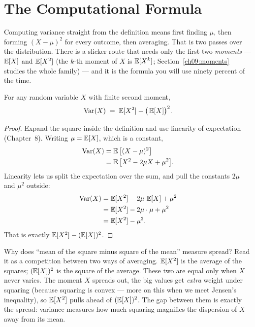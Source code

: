 \section{The Computational Formula}
\label{ch09:compformula}

Computing variance straight from the definition means first finding $\mu$,
then forming $(X-\mu)^2$ for every outcome, then averaging. That is two passes
over the distribution. There is a slicker route that needs only the first two
\emph{moments} --- $\operatorname{\mathbb{E}}[X]$ and $\operatorname{\mathbb{E}}[X^2]$ (the $k$-th moment of $X$ is $\operatorname{\mathbb{E}}[X^k]$; Section~\ref{ch09:moments} studies the whole family) --- and it is the formula you will
use ninety percent of the time.

\begin{theorem}
\label{ch09:thm-comp}
For any random variable $X$ with finite second moment,
\[
  \operatorname{Var}(X) \;=\; \operatorname{\mathbb{E}}[X^2] - \big(\operatorname{\mathbb{E}}[X]\big)^2.
\]
\end{theorem}

\begin{proof}
Expand the square inside the definition and use linearity of expectation
(Chapter~8). Writing $\mu = \operatorname{\mathbb{E}}[X]$, which is a constant,
\begin{align*}
  \operatorname{Var}(X) &= \operatorname{\mathbb{E}}\big[(X-\mu)^2\big] \\
  &= \operatorname{\mathbb{E}}\big[X^2 - 2\mu X + \mu^2\big].
\end{align*}
Linearity lets us split the expectation over the sum, and pull the constants
$2\mu$ and $\mu^2$ outside:
\begin{align*}
  \operatorname{Var}(X) &= \operatorname{\mathbb{E}}[X^2] - 2\mu\,\operatorname{\mathbb{E}}[X] + \mu^2 \\
  &= \operatorname{\mathbb{E}}[X^2] - 2\mu\cdot\mu + \mu^2 \\
  &= \operatorname{\mathbb{E}}[X^2] - \mu^2.
\end{align*}
That is exactly $\operatorname{\mathbb{E}}[X^2] - (\operatorname{\mathbb{E}}[X])^2$. \qedhere
\end{proof}

\begin{whybox}
Why does ``mean of the square minus square of the mean'' measure spread? Read
it as a competition between two ways of averaging. $\operatorname{\mathbb{E}}[X^2]$ is the average of
the squares; $(\operatorname{\mathbb{E}}[X])^2$ is the square of the average. These two are equal
only when $X$ never varies. The moment $X$ spreads out, the big values get
\emph{extra} weight under squaring (because squaring is convex --- more on
this when we meet Jensen's inequality), so $\operatorname{\mathbb{E}}[X^2]$ pulls ahead of
$(\operatorname{\mathbb{E}}[X])^2$. The gap between them is exactly the spread: variance measures how
much squaring magnifies the dispersion of $X$ away from its mean.
\end{whybox}

